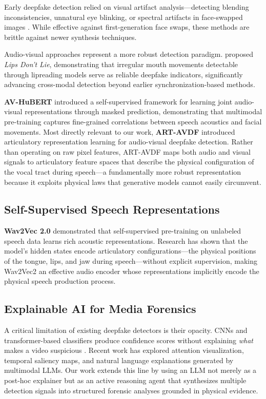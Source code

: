 \documentclass[11pt,a4paper]{article}
\begin{document}
Early deepfake detection relied on visual artifact analysis---detecting blending inconsistencies, unnatural eye blinking, or spectral artifacts in face-swapped images \citep{tolosana2020deepfakes}. While effective against first-generation face swaps, these methods are brittle against newer synthesis techniques.

Audio-visual approaches represent a more robust detection paradigm. \citet{haliassos2021lips} proposed \emph{Lips Don't Lie}, demonstrating that irregular mouth movements detectable through lipreading models serve as reliable deepfake indicators, significantly advancing cross-modal detection beyond earlier synchronization-based methods.

\textbf{AV-HuBERT} \citep{shi2022learning} introduced a self-supervised framework for learning joint audio-visual representations through masked prediction, demonstrating that multimodal pre-training captures fine-grained correlations between speech acoustics and facial movements. Most directly relevant to our work, \textbf{ART-AVDF} \citep{wang2024artavdf} introduced articulatory representation learning for audio-visual deepfake detection. Rather than operating on raw pixel features, ART-AVDF maps both audio and visual signals to articulatory feature spaces that describe the physical configuration of the vocal tract during speech---a fundamentally more robust representation because it exploits physical laws that generative models cannot easily circumvent.

\subsection{Self-Supervised Speech Representations}

\textbf{Wav2Vec 2.0} \citep{baevski2020wav2vec} demonstrated that self-supervised pre-training on unlabeled speech data learns rich acoustic representations. Research has shown that the model's hidden states encode articulatory configurations---the physical positions of the tongue, lips, and jaw during speech---without explicit supervision, making Wav2Vec2 an effective audio encoder whose representations implicitly encode the physical speech production process.

\subsection{Explainable AI for Media Forensics}

A critical limitation of existing deepfake detectors is their opacity. CNNs and transformer-based classifiers produce confidence scores without explaining \emph{what} makes a video suspicious \citep{arrieta2020explainable}. Recent work has explored attention visualization, temporal saliency maps, and natural language explanations generated by multimodal LLMs. Our work extends this line by using an LLM not merely as a post-hoc explainer but as an active reasoning agent that synthesizes multiple detection signals into structured forensic analyses grounded in physical evidence.
\end{document}
